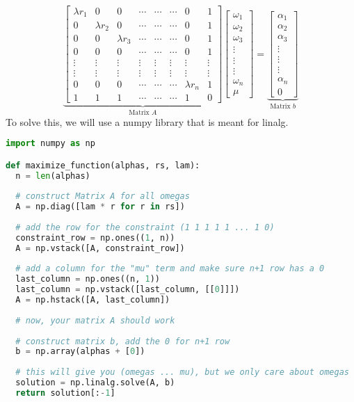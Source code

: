 $$
\underbrace{\begin{bmatrix}
\lambda r_1 & 0 & 0 & \cdots & \cdots & \cdots & 0 & 1\\
0 & \lambda r_2 & 0 & \cdots & \cdots & \cdots & 0 & 1\\
0 & 0 & \lambda r_3 & \cdots & \cdots & \cdots & 0 & 1\\
0 & 0 & 0 & \cdots & \cdots & \cdots & 0 & 1 \\
\vdots & \vdots & \vdots & \vdots & \vdots & \vdots & \vdots & \vdots \\
\vdots & \vdots & \vdots & \vdots & \vdots & \vdots & \vdots & \vdots \\
0 & 0 & 0 & \cdots & \cdots & \cdots & \lambda r_n & 1 \\
1 & 1 & 1 & \cdots & \cdots & \cdots & 1 & 0 
\end{bmatrix}}_{\text{Matrix } A}
\begin{bmatrix}
	\omega_1 \\
	\omega_2 \\
	\omega_3 \\
	\vdots \\
	\vdots \\
	\vdots \\
	\omega_n \\
	\mu
\end{bmatrix} 
=
\underbrace{
\begin{bmatrix}
	\alpha_1 \\
	\alpha_2 \\
	\alpha_3 \\
	\vdots \\
	\vdots \\ 
	\vdots \\
	\alpha_n \\
	0
\end{bmatrix}}_{\text{Matrix }b}
$$
To solve this, we will use a numpy library that is meant for linalg. 

\begin{lstlisting}[language=Python]
import numpy as np

def maximize_function(alphas, rs, lam):
  n = len(alphas)
  
  # construct Matrix A for all omegas
  A = np.diag([lam * r for r in rs])  
  
  # add the row for the constraint (1 1 1 1 1 ... 1 0)
  constraint_row = np.ones((1, n)) 
  A = np.vstack([A, constraint_row]) 
  
  # add a column for the "mu" term and make sure n+1 row has a 0
  last_column = np.ones((n, 1)) 
  last_column = np.vstack([last_column, [[0]]])  
  A = np.hstack([A, last_column])
  
  # now, your matrix A should work
  
  # construct matrix b, add the 0 for n+1 row
  b = np.array(alphas + [0])
  
  # this will give you (omegas ... mu), but we only care about omegas
  solution = np.linalg.solve(A, b)
  return solution[:-1]
\end{lstlisting}